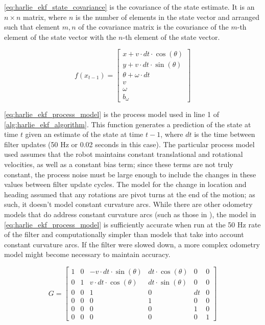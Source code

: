 \eqref{eq:harlie_ekf_state_covariance} is the covariance of the state estimate. It is an $n\times n$ matrix, where $n$ is the number of elements in the state vector and arranged such that element $m,n$ of the covariance matrix is the covariance of the $m$-th element of the state vector with the $n$-th element of the state vector.

\begin{equation}
	f\left(x_{t-1}\right) =
	\begin{bmatrix}
		x + v \cdot dt \cdot \cos\left(\theta\right) \\
		y + v \cdot dt \cdot \sin\left(\theta\right)  \\
		\theta + \omega \cdot dt \\
		v \\
		\omega \\
		b_{\omega}
	\end{bmatrix}
	\label{eq:harlie_ekf_process_model}
\end{equation}

\eqref{eq:harlie_ekf_process_model} is the process model used in line 1 of \autoref{alg:harlie_ekf_algorithm}. This function generates a prediction of the state at time $t$ given an estimate of the state at time $t-1$, where $dt$ is the time between filter updates (50 Hz or 0.02 seconds in this case). The particular process model used assumes that the robot maintains constant translational and rotational velocities, as well as a constant bias term; since these terms are not truly constant, the process noise must be large enough to include the changes in these values between filter update cycles. The model for the change in location and heading assumed that any rotations are pivot turns at the end of the motion; as such, it doesn't model constant curvature arcs. While there are other odometry models that do address constant curvature arcs (such as those in \autocite{ProbRobotics}), the model in \eqref{eq:harlie_ekf_process_model} is sufficiently accurate when run at the 50 Hz rate of the filter and computationally simpler than models that take into account constant curvature arcs. If the filter were slowed down, a more complex odometry model might become necessary to maintain accuracy.

\begin{equation}
	G =
	\begin{bmatrix}
		1 & 0 & -v \cdot dt \cdot \sin\left(\theta\right) & dt \cdot \cos\left(\theta\right) & 0 & 0 \\
		0 & 1 & v \cdot dt \cdot \cos\left(\theta\right) & dt \cdot \sin\left(\theta\right) & 0 & 0 \\
		0 & 0 & 1 & 0 & dt & 0 \\
		0 & 0 & 0 & 1 & 0 & 0 \\
		0 & 0 & 0 & 0 & 1 & 0 \\
		0 & 0 & 0 & 0 & 0 & 1 
	\end{bmatrix}
	\label{eq:harlie_ekf_process_jacobian}
\end{equation}

